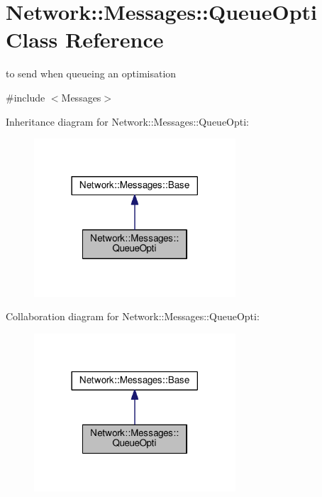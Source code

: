 \hypertarget{class_network_1_1_messages_1_1_queue_opti}{}\section{Network\+:\+:Messages\+:\+:Queue\+Opti Class Reference}
\label{class_network_1_1_messages_1_1_queue_opti}


to send when queueing an optimisation  




{\ttfamily \#include $<$Messages$>$}



Inheritance diagram for Network\+:\+:Messages\+:\+:Queue\+Opti\+:
\nopagebreak
\begin{figure}[H]
\begin{center}
\leavevmode
\includegraphics[width=213pt]{class_network_1_1_messages_1_1_queue_opti__inherit__graph}
\end{center}
\end{figure}


Collaboration diagram for Network\+:\+:Messages\+:\+:Queue\+Opti\+:
\nopagebreak
\begin{figure}[H]
\begin{center}
\leavevmode
\includegraphics[width=213pt]{class_network_1_1_messages_1_1_queue_opti__coll__graph}
\end{center}
\end{figure}
